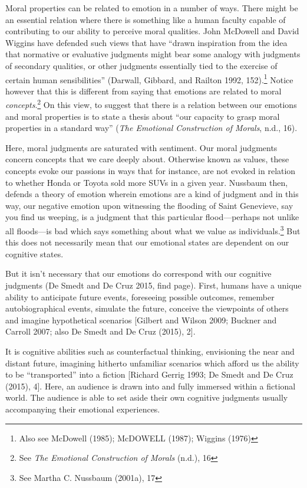 \documentclass[12pt]{book}
\theoremstyle{definition}
\theoremstyle{remark}
\begin{document}
Moral properties can be related to emotion in a number of ways. There might be an essential relation where there is something like a human faculty capable of contributing to our ability to perceive moral qualities. John McDowell and David Wiggins have defended such views that have ``drawn inspiration from the idea that normative or evaluative judgments might bear some analogy with judgments of secondary qualities, or other judgments essentially tied to the exercise of certain human sensibilities'' (Darwall, Gibbard, and Railton 1992, 152).\footnote{Also see McDowell (1985); McDOWELL (1987); Wiggins (1976)} Notice however that this is different from saying that emotions are related to moral \emph{concepts}.\footnote{See \emph{The {Emotional Construction} of {Morals}} (n.d.), 16} On this view, to suggest that there is a relation between our emotions and moral properties is to state a thesis about ``our capacity to grasp moral properties in a standard way'' (\emph{The {Emotional Construction} of {Morals}}, n.d., 16).

Here, moral judgments are saturated with sentiment. Our moral judgments concern concepts that we care deeply about. Otherwise known as values, these concepts evoke our passions in ways that for instance, are not evoked in relation to whether Honda or Toyota sold more SUVs in a given year. Nussbaum then, defends a theory of emotion wherein emotions are a kind of judgment and in this way, our negative emotion upon witnessing the flooding of Saint Genevieve, say you find us weeping, is a judgment that this particular flood---perhaps not unlike all floods---is bad which says something about what we value as individuals.\footnote{See Martha C. Nussbaum (2001a), 17} But this does not necessarily mean that our emotional states are dependent on our cognitive states.

But it isn't necessary that our emotions do correspond with our cognitive judgments (De Smedt and De Cruz 2015, find page). First, humans have a unique ability to anticipate future events, foreseeing possible outcomes, remember autobiographical events, simulate the future, conceive the viewpoints of others and imagine hypothetical scenarios {[}Gilbert and Wilson 2009; Buckner and Carroll 2007; also De Smedt and De Cruz (2015), 2{]}.

It is cognitive abilities such as counterfactual thinking, envisioning the near and distant future, imagining hitherto unfamiliar scenarios which afford us the ability to be ``transported'' into a fiction {[}Richard Gerrig 1993; De Smedt and De Cruz (2015), 4{]}. Here, an audience is drawn into and fully immersed within a fictional world. The audience is able to set aside their own cognitive judgments usually accompanying their emotional experiences.
\end{document}
